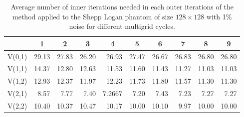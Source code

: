 \begin{table}[htp]
\caption{Average number of inner iterations needed in each outer iterations of the method applied to the Shepp Logan phantom of size $128 \times 128$ with 1\% noise for different multigrid cycles.}
\begin{center}
\begin{tabular}{|l|r|r|r|r|r|r|r|r|r|}
\hline
& \multicolumn{1}{c|}{1} & \multicolumn{1}{c|}{2} & \multicolumn{1}{c|}{3} & \multicolumn{1}{c|}{4} & \multicolumn{1}{c|}{5} & \multicolumn{1}{c|}{6} & \multicolumn{1}{c|}{7} & \multicolumn{1}{c|}{8} & \multicolumn{1}{c|}{9} \\
\hline
V(0,1) & 29.13 & 27.83 & 26.20 & 26.93 & 27.47 & 26.67 & 26.83 & 26.80 & 26.80 \\
V(1,1) & 14.37 & 12.80 & 12.63 & 11.53 & 11.60 & 11.43 & 11.27 & 11.03 & 11.03 \\
V(1,2) & 12.93 & 12.37 & 11.97 & 12.23 & 11.73 & 11.80 & 11.57 & 11.30 & 11.30 \\
V(2,1) & 8.57 & 7.77 & 7.40 & 7.2667 & 7.20 & 7.43 & 7.23 & 7.27 & 7.27 \\
V(2,2) & 10.40 & 10.37 & 10.47 & 10.17 & 10.00 & 10.10 & 9.97 & 10.00 & 10.00 \\
\hline
\end{tabular}
\end{center}
\label{tab:its_cycling}
\end{table}%


